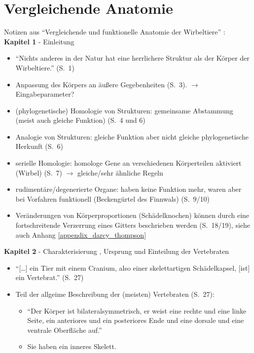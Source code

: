 \chapter{Vergleichende Anatomie}
\label{appendix_vergleichende_anatomie}

Notizen aus "`Vergleichende und funktionelle Anatomie der Wirbeltiere"' \cite{Vergleichende_Anatomie}:\\

\textbf{Kapitel 1} - Einleitung
\begin{itemize}
 \item "`Nichts anderes in der Natur hat eine herrlichere Struktur als der Körper der Wirbeltiere."' (S.\ 1)
 \item Anpassung des Körpers an äußere Gegebenheiten (S.\ 3). $\rightarrow$ Eingabeparameter?
 \item (phylogenetische) Homologie von Strukturen: gemeinsame Abstammung (meist auch gleiche Funktion) (S.\ 4 und 6)
 \item Analogie von Strukturen: gleiche Funktion aber nicht gleiche phylogenetische Herkunft (S.\ 6)
 \item serielle Homologie: homologe Gene an verschiedenen Körperteilen aktiviert (\zb Wirbel) (S.\ 7) $\rightarrow$ gleiche/sehr ähnliche Regeln
 \item rudimentäre/degenerierte Organe: haben keine Funktion mehr, waren aber bei Vorfahren funktionell (\zb Beckengürtel des Finnwals) (S.\ 9/10)
 \item Veränderungen von Körperproportionen (\zb Schädelknochen) können durch eine fortschreitende Verzerrung eines Gitters beschrieben werden (S.\ 18/19), siehe auch  Anhang \ref{appendix_darcy_thompson}
\end{itemize}

\textbf{Kapitel 2} - Charakterisierung , Ursprung und Einteilung der Vertebraten
\begin{itemize}
 \item "`[\dots] ein Tier mit einem Cranium, also einer skelettartigen Schädelkapsel, [ist] ein Vertebrat."' (S.\ 27)
 \item Teil der allgeime Beschreibung der (meisten) Vertebraten (S.\ 27): 
 \begin{itemize}
  \item "`Der Körper ist bilateralsymmetrisch, \dash er weist eine rechte und eine linke Seite, ein anteriores und ein posteriores Ende und eine dorsale und eine ventrale Oberfläche auf."'
  \item Sie haben ein inneres Skelett.
 \end{itemize}
\end{itemize}

